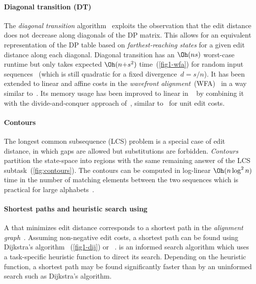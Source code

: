 \paragraph{Diagonal transition (DT)}
The \emph{diagonal transition}
algorithm~\citep{ukkonen1985algorithms,myers1986ano} exploits the observation
that the edit distance does not decrease along diagonals of the DP matrix. This
allows for an equivalent representation of the DP table based on
\emph{farthest-reaching states} for a given edit distance along each diagonal.
Diagonal transition has an $\Oh(ns)$ worst-case runtime but only takes expected
$\Oh(n{+}s^2)$ time~(\cref{fig1-wfa}) for random input
sequences~\citep{myers1986ano} (which is still quadratic for a fixed
divergence~$d=s/n$). It has been extended to linear and affine costs in the
\emph{wavefront alignment}~(WFA)~\citep{marco2021fast} in a way similar
to~\citet{gotoh1982improved}. Its memory usage has been improved to linear in
\wfa~\citep{marco2022optimal} by combining it with the divide-and-conquer
approach of~\citet{hirschberg1975linear}, similar to~\citet{myers1986ano} for
unit edit costs.

\paragraph{Contours}
The longest common subsequence (LCS) problem is a special case of edit distance,
in which gaps are allowed but substitutions are forbidden. \emph{Contours}
partition the state-space into regions with the same remaining answer of the LCS
subtask~(\cref{fig:contours}). The contours can be computed in log-linear
$\Oh(n\log^2 n)$ time in the number of matching elements between the two
sequences which is practical for large
alphabets~\citep{hirschberg1977algorithms,hunt1977fast}.

\paragraph{Shortest paths and heuristic search using \A}
A \pa that minimizes edit distance corresponds to a shortest path in the
\emph{alignment graph}~\citep{vintsyuk1968speech,ukkonen1985algorithms}.
Assuming non-negative edit costs, a shortest path can be found using Dijkstra's
algorithm~\citep{ukkonen1985algorithms} (\cref{fig1-dij}) or
\A~\citep{hart1968formal,spouge1989speeding}. \A is an informed search algorithm which uses a
task-specific heuristic function to direct its search. Depending on the
heuristic function, a shortest path may be found significantly faster than by an
uninformed search such as Dijkstra's algorithm.

